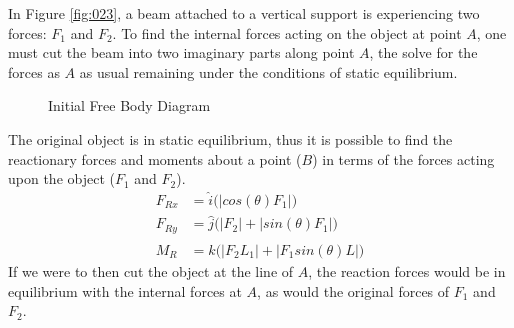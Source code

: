 \documentclass[12pt]{article}
\begin{document}
In Figure \ref{fig:023}, a beam attached to a vertical support is experiencing two forces:
$F_1$ and $F_2$. To find the internal forces acting on the object at point $A$, one must
cut the beam into two imaginary parts along point $A$, the solve for the forces as $A$ as
usual remaining under the conditions of static equilibrium.

\begin{figure}[H]
  \centering
  
  \caption{Initial Free Body Diagram}
  \label{fig:025}
\end{figure}

The original object is in static equilibrium, thus it is possible to find the reactionary
forces and moments about a point ($B$) in terms of the forces acting upon the object ($F_1$ and $F_2$).
\begin{align*}
  F_{Rx} &= \hat{i} \big(|cos(\theta)F_1|\big) \\
  F_{Ry} &= \hat{j} \big(|F_2| + |sin(\theta)F_1|\big) \\
  M_{R}  &= \hat{k} \big(|F_2L_1| + |F_1sin(\theta)L|\big)
\end{align*}
If we were to then cut the object at the line of $A$, the reaction forces would be in
equilibrium with the internal forces at $A$, as would the original forces of $F_1$ and $F_2$.
\end{document}
